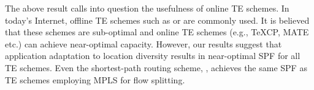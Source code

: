 
The above result calls into question the usefulness of online TE schemes. In today's Internet, offline TE schemes such as \optwt{} or \mplsavg{} are commonly used. It is believed that these schemes are sub-optimal and online TE schemes (e.g., TeXCP, MATE etc.) can achieve near-optimal capacity.  However, our results suggest that application adaptation to location diversity results in near-optimal SPF for all TE schemes.  Even the shortest-path routing scheme, \optwt{}, achieves the same SPF as TE schemes employing MPLS for flow splitting.








